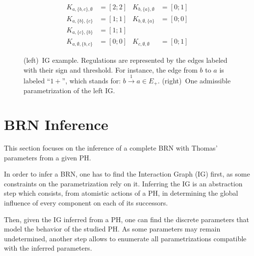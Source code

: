 \documentclass[11pt,a4paper,twoside]{epig}
\newcounter{la}
\begin{document}
\begin{figure}[t]
\begin{minipage}{0.4\linewidth}
\centering
{}
\end{minipage}
\begin{minipage}{0.6\linewidth}
\centering
\begin{align*}
K_{a,\{b,c\},\emptyset} &= [2 ; 2] & K_{b,\{a\},\emptyset} &= [0 ; 1] \\
K_{a,\{b\},\{c\}} &= [1 ; 1] & K_{b,\emptyset,\{a\}} &= [0 ; 0] \\
K_{a,\{c\},\{b\}} &= [1 ; 1] &&\\
K_{a,\emptyset,\{b,c\}} &= [0 ; 0] & K_{c,\emptyset,\emptyset} &= [0 ; 1]
\end{align*}
\end{minipage}
\caption{\label{fig:runningBRN}
(left)~IG example.
Regulations are represented by the edges labeled with their sign and threshold.
For instance, the edge from $b$ to $a$ is labeled “$1+$”, which stands for: $b \xrightarrow{1} a \in
E_+$.
(right)~One admissible parametrization of the left IG.
}
\end{figure}



\section{BRN Inference}

This section focuses on the inference of a complete BRN with Thomas' parameters from a given PH.

In order to infer a BRN, one has to find the Interaction Graph (IG) first, as some constraints on the parametrization rely on it.
Inferring the IG is an abstraction step which consists, from atomistic actions of a PH, in determining the global influence of every component on each of its successors.

Then, given the IG inferred from a PH, one can find the discrete parameters that model the behavior of the studied PH.
As some parameters may remain undetermined, another step allows to enumerate all parametrizations compatible with the inferred parameters.
\end{document}
